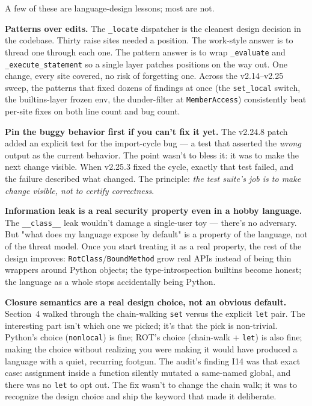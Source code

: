 \documentclass[11pt]{article}
\begin{document}
A few of these are language-design lessons; most are not.

\textbf{Patterns over edits.} The \texttt{\_locate} dispatcher is the cleanest design decision in the codebase. Thirty raise sites needed a position. The work-style answer is to thread one through each one. The pattern answer is to wrap \texttt{\_evaluate} and \texttt{\_execute\_statement} so a single layer patches positions on the way out. One change, every site covered, no risk of forgetting one. Across the v2.14--v2.25 sweep, the patterns that fixed dozens of findings at once (the \texttt{set\_local} switch, the builtins-layer frozen env, the dunder-filter at \texttt{MemberAccess}) consistently beat per-site fixes on both line count and bug count.

\textbf{Pin the buggy behavior first if you can't fix it yet.} The v2.24.8 patch added an explicit test for the import-cycle bug --- a test that asserted the \emph{wrong} output as the current behavior. The point wasn't to bless it: it was to make the next change visible. When v2.25.3 fixed the cycle, exactly that test failed, and the failure described what changed. The principle: \emph{the test suite's job is to make change visible, not to certify correctness}.

\textbf{Information leak is a real security property even in a hobby language.} The \texttt{\_\_class\_\_} leak wouldn't damage a single-user toy --- there's no adversary. But "what does my language expose by default" is a property of the language, not of the threat model. Once you start treating it as a real property, the rest of the design improves: \texttt{RotClass}/\texttt{BoundMethod} grow real APIs instead of being thin wrappers around Python objects; the type-introspection builtins become honest; the language as a whole stops accidentally being Python.

\textbf{Closure semantics are a real design choice, not an obvious default.} Section~4 walked through the chain-walking \texttt{set} versus the explicit \texttt{let} pair. The interesting part isn't which one we picked; it's that the pick is non-trivial. Python's choice (\texttt{nonlocal}) is fine; ROT's choice (chain-walk + \texttt{let}) is also fine; making the choice without realizing you were making it would have produced a language with a quiet, recurring footgun. The audit's finding I14 was that exact case: assignment inside a function silently mutated a same-named global, and there was no \texttt{let} to opt out. The fix wasn't to change the chain walk; it was to recognize the design choice and ship the keyword that made it deliberate.
\end{document}
